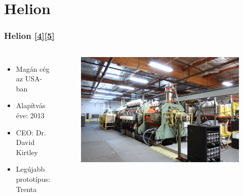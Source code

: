 \documentclass{beamer}
\begin{document}
\section{Helion}
\begin{frame}
    \frametitle{Helion \hyperlink{4}{\small[4]}\hyperlink{5}{\small[5]}}
    \begin{columns}
        \begin{itemize}
            \item Magán cég az USA-ban
            \item Alapítvás éve: 2013
            \item CEO: Dr. David Kirtley
            \item Legújabb prototípus: Trenta
        \end{itemize}
        \begin{figure}
            \includegraphics[scale=0.2]{trenta-1-1400x934.png}
        \end{figure}    
    \end{columns}
\end{frame}
\end{document}
